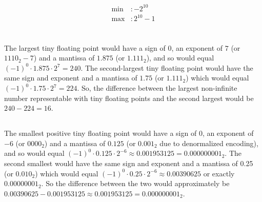\documentclass{article}
\begin{document}
\subsection{}
\begin{align*}
    \text{min}&: -2^{10} \\
    \text{max}&: 2^{10} - 1
\end{align*}
\newpage

\section{}
\subsection{}
The largest tiny floating point would have a sign of \(0\), an exponent of \(7\) (or \(1110_2 - 7\)) and a mantissa of \(1.875\) (or \(1.111_2\)), and so would equal \((-1)^{0} \cdot 1.875 \cdot 2^{7} = 240\). The second-largest tiny floating point would have the same sign and exponent and a mantissa of \(1.75\) (or \(1.111_2\)) which would equal \((-1)^0 \cdot 1.75 \cdot 2^{7} = 224\). So, the difference between the largest non-infinite number representable with tiny floating points and the second largest would be \(240-224=16\).
\subsection{}
The smallest positive tiny floating point would have a sign of \(0\), an exponent of \(-6\) (or \(0000_2\)) and a mantissa of \(0.125\) (or \(0.001_2\) due to denormalized encoding), and so would equal \((-1)^{0} \cdot 0.125 \cdot 2^{-6} \approx 0.001953125 = 0.000000001_2\). The second smallest would have the same sign and exponent and a mantissa of 0.25 (or \(0.010_2\)) which would equal \((-1)^{0} \cdot 0.25 \cdot 2^{-6} \approx 0.00390625\) or exactly \(0.00000001_2\). So the difference between the two would approximately be \( 0.00390625 - 0.001953125 \approx 0.001953125 = 0.000000001_2 \).
\end{document}
